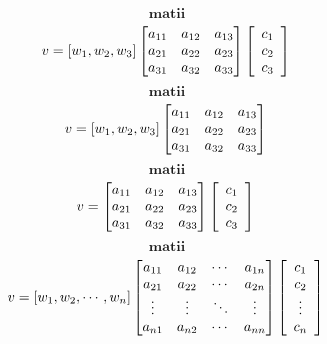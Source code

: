 \documentclass[10pt]{article}
\begin{document}
$$\textbf{matii}$$
\[
    v =
    \left[w_1, w_2, w_3 \right]
    \begin{bmatrix}
    a_{11} & a_{12} & a_{13} \\
    a_{21} & a_{22} & a_{23} \\
    a_{31} & a_{32} & a_{33}  \\
    \end{bmatrix}
    \left[ \begin{array}{cc} 
    c_1 \\
    c_2 \\
    c_3
    \end{array} 
    \right] \\
\]
$$\textbf{matii}$$
\[
    v =
    \left[w_1, w_2, w_3 \right]
    \begin{bmatrix}
    a_{11} & a_{12} & a_{13} \\
    a_{21} & a_{22} & a_{23} \\
    a_{31} & a_{32} & a_{33}  \\
    \end{bmatrix} \\
\]
$$\textbf{matii}$$
\[
    v =
    \begin{bmatrix}
    a_{11} & a_{12} & a_{13} \\
    a_{21} & a_{22} & a_{23} \\
    a_{31} & a_{32} & a_{33}  \\
    \end{bmatrix} 
    \left[ \begin{array}{cc} 
    c_1 \\
    c_2 \\
    c_3
    \end{array} 
    \right] \\
\]
$$\textbf{matii}$$
\[
    v =
    \left[w_1, w_2, \cdots, w_n \right]
    \begin{bmatrix}
    a_{11} & a_{12} & \cdots & a_{1n} \\
    a_{21} & a_{22} & \cdots & a_{2n} \\
    \vdots & \vdots  & \ddots & \vdots  \\
    a_{n1} & a_{n2} & \cdots & a_{nn} 
    \end{bmatrix}
    \left[ \begin{array}{cc} 
    c_1 \\
    c_2 \\
    \vdots \\
    c_n
    \end{array} 
    \right] \\
\]
\end{document}
